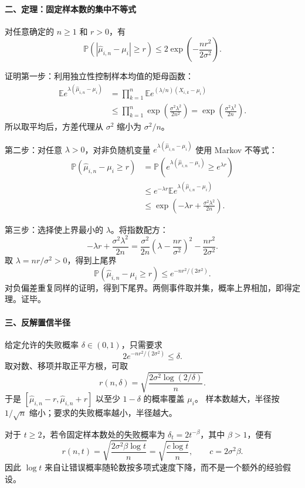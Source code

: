 \documentclass[
  11pt,
  a4paper,
]{ctexart}
\begin{document}
\paragraph{二、定理：固定样本数的集中不等式}
对任意确定的 \(n\ge1\) 和 \(r>0\)，有
\[
\boxed{\mathbb P\!\left(
|\widehat\mu_{i,n}-\mu_i|\ge r
\right)\le 2\exp\!\left(-\frac{nr^2}{2\sigma^2}\right).}
\]

证明第一步：利用独立性控制样本均值的矩母函数：
\[
\begin{aligned}
\mathbb E e^{\lambda(\widehat\mu_{i,n}-\mu_i)}
&=\prod_{k=1}^n
\mathbb E e^{(\lambda/n)(X_{i,k}-\mu_i)}\\
&\le\prod_{k=1}^n
\exp\!\left(\frac{\sigma^2\lambda^2}{2n^2}\right)
=\exp\!\left(\frac{\sigma^2\lambda^2}{2n}\right).
\end{aligned}
\]
所以取平均后，方差代理从 \(\sigma^2\) 缩小为 \(\sigma^2/n\)。

第二步：对任意 \(\lambda>0\)，对非负随机变量
\(e^{\lambda(\widehat\mu_{i,n}-\mu_i)}\) 使用 Markov 不等式：
\[
\begin{aligned}
\mathbb P(\widehat\mu_{i,n}-\mu_i\ge r)
&=\mathbb P\!\left(e^{\lambda(\widehat\mu_{i,n}-\mu_i)}
                    \ge e^{\lambda r}\right)\\
&\le e^{-\lambda r}
       \mathbb E e^{\lambda(\widehat\mu_{i,n}-\mu_i)}\\
&\le \exp\!\left(-\lambda r+
                      \frac{\sigma^2\lambda^2}{2n}\right).
\end{aligned}
\]

第三步：选择使上界最小的 \(\lambda\)。将指数配方：
\[
-\lambda r+\frac{\sigma^2\lambda^2}{2n}
=\frac{\sigma^2}{2n}
  \left(\lambda-\frac{nr}{\sigma^2}\right)^2
 -\frac{nr^2}{2\sigma^2}.
\]
取 \(\lambda=nr/\sigma^2>0\)，得到上尾界
\[
\mathbb P(\widehat\mu_{i,n}-\mu_i\ge r)
\le e^{-nr^2/(2\sigma^2)}.
\]
对负偏差重复同样的证明，得到下尾界。两侧事件取并集，概率上界相加，即得定理。证毕。

\paragraph{三、反解置信半径}
给定允许的失败概率 \(\delta\in(0,1)\)，只需要求
\[
2e^{-nr^2/(2\sigma^2)}\le\delta.
\]
取对数、移项并取正平方根，可取
\[
\boxed{r(n,\delta)=
\sqrt{\frac{2\sigma^2\log(2/\delta)}{n}}.}
\]
于是 \([\widehat\mu_{i,n}-r,\widehat\mu_{i,n}+r]\)
以至少 \(1-\delta\) 的概率覆盖 \(\mu_i\)。
样本数越大，半径按 \(1/\sqrt n\) 缩小；要求的失败概率越小，半径越大。

对于 \(t\ge2\)，若令固定样本数处的失败概率为
\(\delta_t=2t^{-\beta}\)，其中 \(\beta>1\)，便有
\[
r(n,t)=\sqrt{\frac{2\sigma^2\beta\log t}{n}}
       =\sqrt{\frac{c\log t}{n}},
\qquad c=2\sigma^2\beta.
\]
因此 \(\log t\) 来自让错误概率随轮数按多项式速度下降，而不是一个额外的经验假设。
\end{document}
